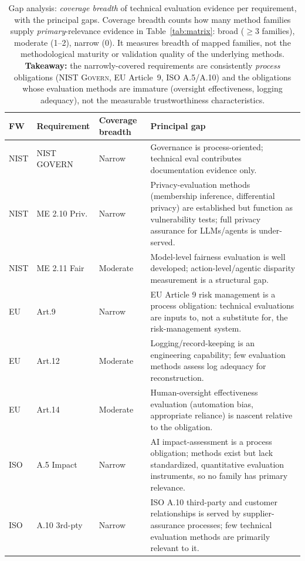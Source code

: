 \begin{table}[t]
\centering
\caption{Gap analysis: \emph{coverage breadth} of technical evaluation evidence per requirement, with the principal gaps. Coverage breadth counts how many method families supply \emph{primary}-relevance evidence in Table~\ref{tab:matrix}: broad ($\geq$3 families), moderate (1--2), narrow (0). It measures breadth of mapped families, not the methodological maturity or validation quality of the underlying methods. \textbf{Takeaway:} the narrowly-covered requirements are consistently \emph{process} obligations (NIST \textsc{Govern}, EU Article~9, ISO A.5/A.10) and the obligations whose evaluation methods are immature (oversight effectiveness, logging adequacy), not the measurable trustworthiness characteristics.}
\label{tab:gap}
\footnotesize
\begin{tabular}{p{}p{}p{}p{}}
\toprule
FW & Requirement & Coverage breadth & Principal gap\\
\midrule
NIST & NIST GOVERN & Narrow & Governance is process-oriented; technical eval contributes documentation evidence only.\\
NIST & ME 2.10 Priv. & Narrow & Privacy-evaluation methods (membership inference, differential privacy) are established but function as vulnerability tests; full privacy assurance for LLMs/agents is under-served.\\
NIST & ME 2.11 Fair & Moderate & Model-level fairness evaluation is well developed; action-level/agentic disparity measurement is a structural gap.\\
EU & Art.9 & Narrow & EU Article 9 risk management is a process obligation: technical evaluations are inputs to, not a substitute for, the risk-management system.\\
EU & Art.12 & Moderate & Logging/record-keeping is an engineering capability; few evaluation methods assess log adequacy for reconstruction.\\
EU & Art.14 & Moderate & Human-oversight effectiveness evaluation (automation bias, appropriate reliance) is nascent relative to the obligation.\\
ISO & A.5 Impact & Narrow & AI impact-assessment is a process obligation; methods exist but lack standardized, quantitative evaluation instruments, so no family has primary relevance.\\
ISO & A.10 3rd-pty & Narrow & ISO A.10 third-party and customer relationships is served by supplier-assurance processes; few technical evaluation methods are primarily relevant to it.\\
\bottomrule
\end{tabular}
\end{table}
